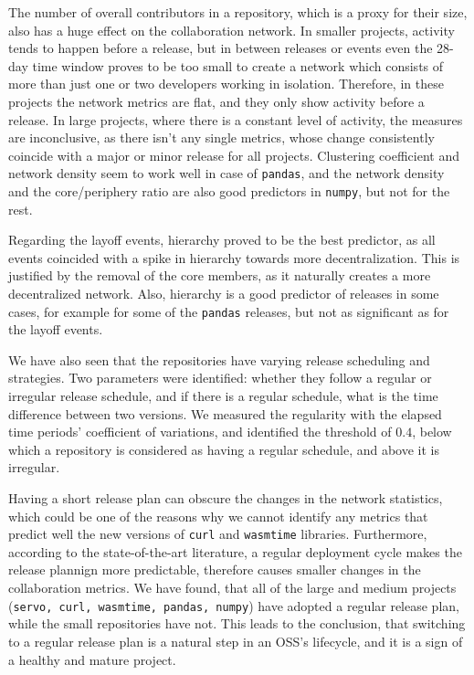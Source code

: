 The number of overall contributors in a repository, which is a proxy for their size, also has a huge effect on the collaboration network. In smaller projects, activity tends to happen before a release, but in between releases or events even the 28-day time window proves to be too small to create a network which consists of more than just one or two developers working in isolation. Therefore, in these projects the network metrics are flat, and they only show activity before a release. In large projects, where there is a constant level of activity, the measures are inconclusive, as there isn't any single metrics, whose change consistently coincide with a major or minor release for all projects. Clustering coefficient and network density seem to work well in case of \texttt{pandas}, and the network density and the core/periphery ratio are also good predictors in \texttt{numpy}, but not for the rest.

Regarding the layoff events, hierarchy proved to be the best predictor, as all events coincided with a spike in hierarchy towards more decentralization. This is justified by the removal of the core members, as it naturally creates a more decentralized network. Also, hierarchy is a good predictor of releases in some cases, for example for some of the \texttt{pandas} releases, but not as significant as for the layoff events.

We have also seen that the repositories have varying release scheduling and strategies. Two parameters were identified: whether they follow a regular or irregular release schedule, and if there is a regular schedule, what is the time difference between two versions. We measured the regularity with the elapsed time periods' coefficient of variations, and identified the threshold of $0.4$, below which a repository is considered as having a regular schedule, and above it is irregular.

Having a short release plan can obscure the changes in the network statistics, which could be one of the reasons why we cannot identify any metrics that predict well the new versions of \texttt{curl} and \texttt{wasmtime} libraries. Furthermore, according to the state-of-the-art literature, a regular deployment cycle makes the release plannign more predictable, therefore causes smaller changes in the collaboration metrics. We have found, that all of the large and medium projects (\texttt{servo, curl, wasmtime, pandas, numpy}) have adopted a regular release plan, while the small repositories have not. This leads to the conclusion, that switching to a regular release plan is a natural step in an OSS's lifecycle, and it is a sign of a healthy and mature project. \\

